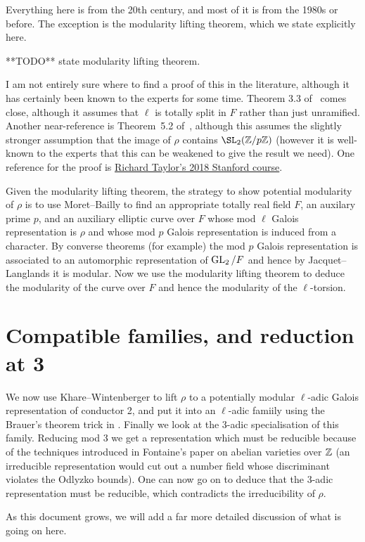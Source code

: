 Everything here is from the 20th century, and most of it is from the 1980s or before.
The exception is the modularity lifting theorem, which we state explicitly here.

**TODO** state modularity lifting theorem.

I am not entirely sure where to find a proof of this in the literature, although it has certainly been known to the experts for some time. Theorem 3.3 of~\cite{taylor-mero-cont} comes close, although it assumes that $\ell$ is totally split in $F$ rather than just unramified. Another near-reference is Theorem~5.2 of~\cite{toby-modularity}, although this assumes
the slightly stronger assumption that the image of $\rho$ contains $\SL_2(\Z/p\Z)$ (however it is well-known to the experts that this can be weakened to give the result we need). One reference for the proof is \href{https://math.berkeley.edu/~fengt/249A_2018.pdf}{Richard Taylor's 2018 Stanford course}. 

Given the modularity lifting theorem, the strategy to show potential modularity of $\rho$ is to use Moret--Bailly to find an appropriate totally real field $F$, an auxilary prime $p$, and an auxiliary elliptic curve over $F$ whose mod $\ell$ Galois representation is $\rho$ and whose
mod $p$ Galois representation is induced from a character. By converse theorems (for example)
the mod $p$ Galois representation is associated to an automorphic representation of
$\operatorname{GL}_2/F$ and hence by Jacquet--Langlands it is modular. Now we use the
modularity lifting theorem to deduce the modularity of the curve over $F$ and hence
the modularity of the $\ell$-torsion. 

\section{Compatible families, and reduction at 3}

We now use Khare--Wintenberger to lift $\rho$ to a potentially modular $\ell$-adic
Galois representation of conductor 2, and put it into an $\ell$-adic famiily using
the Brauer's theorem trick in \cite{blggt}. Finally we look at the 3-adic specialisation
of this family. Reducing mod 3 we get a representation which must be reducible because
of the techniques introduced in Fontaine's paper on abelian varieties over $\mathbb{Z}$ (an irreducible
representation would cut out a number field whose discriminant violates the Odlyzko bounds).
One can now go on to deduce that the 3-adic representation must be reducible, which
contradicts the irreducibility of $\rho$.

As this document grows, we will add a far more detailed discussion of
what is going on here. 






